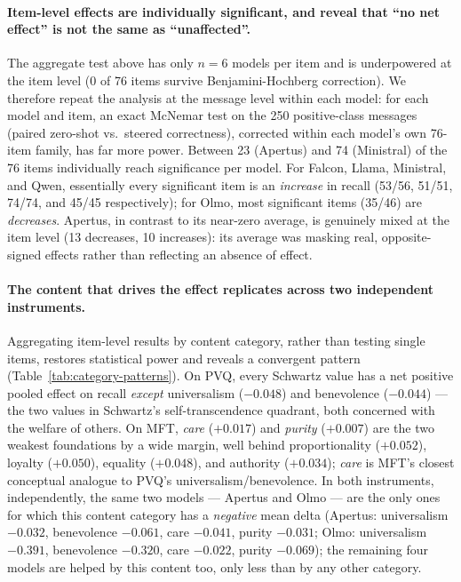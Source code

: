 \paragraph{Item-level effects are individually significant, and reveal that
``no net effect'' is not the same as ``unaffected''.} The aggregate test above has only
$n=6$ models per item and is underpowered at the item level (0 of 76 items survive
Benjamini-Hochberg correction). We therefore repeat the analysis at the message level
within each model: for each model and item, an exact McNemar test on the 250
positive-class messages (paired zero-shot vs.\ steered correctness), corrected within
each model's own 76-item family, has far more power. Between 23 (Apertus) and 74
(Ministral) of the 76 items individually reach significance per model. For Falcon,
Llama, Ministral, and Qwen, essentially every significant item is an \emph{increase}
in recall (53/56, 51/51, 74/74, and 45/45 respectively); for Olmo, most significant
items (35/46) are \emph{decreases}. Apertus, in contrast to its near-zero average, is
genuinely mixed at the item level (13 decreases, 10 increases): its average was masking
real, opposite-signed effects rather than reflecting an absence of effect.

\paragraph{The content that drives the effect replicates across two independent
instruments.} Aggregating item-level results by content category, rather than testing
single items, restores statistical power and reveals a convergent pattern
(Table~\ref{tab:category-patterns}). On PVQ, every Schwartz value has a net positive
pooled effect on recall \emph{except} universalism ($-0.048$) and benevolence
($-0.044$) — the two values in Schwartz's self-transcendence quadrant, both concerned
with the welfare of others. On MFT, \emph{care} ($+0.017$) and \emph{purity}
($+0.007$) are the two weakest foundations by a wide margin, well behind
proportionality ($+0.052$), loyalty ($+0.050$), equality ($+0.048$), and authority
($+0.034$); \emph{care} is MFT's closest conceptual analogue to PVQ's
universalism/benevolence. In both instruments, independently, the same two models —
Apertus and Olmo — are the only ones for which this content category has a
\emph{negative} mean delta (Apertus: universalism $-0.032$, benevolence $-0.061$, care
$-0.041$, purity $-0.031$; Olmo: universalism $-0.391$, benevolence $-0.320$, care
$-0.022$, purity $-0.069$); the remaining four models are helped by this content too,
only less than by any other category.

